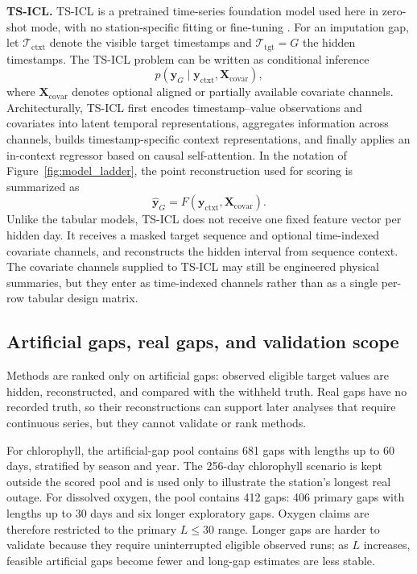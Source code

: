 \textbf{TS-ICL.}
TS-ICL is a pretrained time-series foundation model used here in zero-shot mode, with no
station-specific fitting or fine-tuning \citep{lenaour2026tsicl,tsicl_software}. For an
imputation gap, let $\mathcal T_{\mathrm{ctxt}}$ denote the visible target timestamps and
$\mathcal T_{\mathrm{tgt}}=G$ the hidden timestamps. The TS-ICL problem can be written as
conditional inference
\[
    p\!\left(\mathbf y_G
    \mid
    \mathbf y_{\mathrm{ctxt}},\mathbf X_{\mathrm{covar}}\right),
\]
where $\mathbf X_{\mathrm{covar}}$ denotes optional aligned or partially available covariate
channels. Architecturally, TS-ICL first encodes timestamp--value observations and covariates into
latent temporal representations, aggregates information across channels, builds
timestamp-specific context representations, and finally applies an in-context regressor based on
causal self-attention. In the notation of Figure~\ref{fig:model_ladder}, the point
reconstruction used for scoring is summarized as
\[
    \hat{\mathbf y}_G = F(\mathbf y_{\mathrm{ctxt}},\mathbf X_{\mathrm{covar}}).
\]
Unlike the tabular models, TS-ICL does not receive one fixed feature vector per hidden day. It
receives a masked target sequence and optional time-indexed covariate channels, and reconstructs
the hidden interval from sequence context. The covariate channels supplied to TS-ICL may still be
engineered physical summaries, but they enter as time-indexed channels rather than as a single
per-row tabular design matrix.

\subsection{Artificial gaps, real gaps, and validation scope}
\label{sec:artificial_gaps}

Methods are ranked only on artificial gaps: observed eligible target values are hidden,
reconstructed, and compared with the withheld truth. Real gaps have no recorded truth, so their
reconstructions can support later analyses that require continuous series, but they cannot
validate or rank methods.

For chlorophyll, the artificial-gap pool contains 681 gaps with lengths up to 60 days,
stratified by season and year. The 256-day chlorophyll scenario is kept outside the scored pool
and is used only to illustrate the station's longest real outage. For dissolved oxygen, the pool
contains 412 gaps: 406 primary gaps with lengths up to 30 days and six longer exploratory gaps.
Oxygen claims are therefore restricted to the primary $L \leq 30$ range. Longer gaps are harder
to validate because they require uninterrupted eligible observed runs; as $L$ increases, feasible
artificial gaps become fewer and long-gap estimates are less stable.

